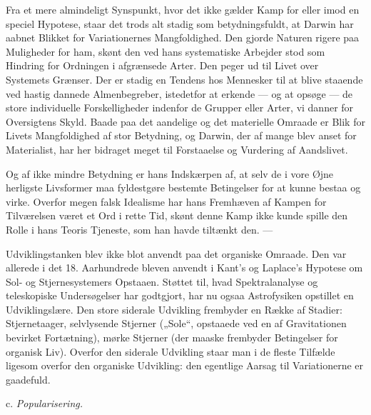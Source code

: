 \documentclass[12pt,a4paper,openany]{book}
\newcommand{\sectionhead}[2]{\par\bigskip\phantomsection\begin{center}#1 \textit{#2}\end{center}\addcontentsline{toc}{section}{#1 #2}\medskip\ignorespaces}
\begin{document}
Fra et mere almindeligt Synspunkt, hvor det ikke gælder Kamp
for eller imod en speciel Hypotese, staar det trods alt stadig som
betydningsfuldt, at Darwin har aabnet Blikket for Variationernes
Mangfoldighed. Den gjorde Naturen rigere paa Muligheder for ham,
skønt den ved hans systematiske Arbejder stod som Hindring for
Ordningen i afgrænsede Arter. Den peger ud til Livet over Systemets
Grænser. Der er stadig en Tendens hos Mennesker til at blive staaende
ved hastig dannede Almenbegreber, istedetfor at erkende
--- og at opsøge --- de store individuelle Forskelligheder indenfor de
Grupper eller Arter, vi danner for Oversigtens Skyld. Baade paa det
aandelige og det materielle Omraade er Blik for Livets Mangfoldighed
af stor Betydning, og Darwin, der af mange blev anset for Materialist,
har her bidraget meget til Forstaaelse og Vurdering af
Aandslivet.

Og af ikke mindre Betydning er hans Indskærpen af, at selv de i
vore Øjne herligste Livsformer maa fyldestgøre bestemte Betingelser
for at kunne bestaa og virke. Overfor megen falsk Idealisme har
hans Fremhæven af Kampen for Tilværelsen været et Ord i rette
Tid, skønt denne Kamp ikke kunde spille den Rolle i hans Teoris
Tjeneste, som han havde tiltænkt den. ---

Udviklingstanken blev ikke blot anvendt paa det organiske Omraade.
Den var allerede i det 18. Aarhundrede bleven anvendt i
Kant’s og Laplace’s Hypotese om Sol- og Stjernesystemers Opstaaen.
Støttet til, hvad Spektralanalyse og teleskopiske Undersøgelser har
godtgjort, har nu ogsaa Astrofysiken opstillet en Udviklingslære.
Den store siderale Udvikling frembyder en Række af Stadier:
Stjernetaager, selvlysende Stjerner („Sole“, opstaaede ved en af
Gravitationen bevirket Fortætning), mørke Stjerner (der maaske
frembyder Betingelser for organisk Liv). Overfor den siderale Udvikling
staar man i de fleste Tilfælde ligesom overfor den organiske
Udvikling: den egentlige Aarsag til Variationerne er gaadefuld.
\sectionhead{c.}{Popularisering.}
\end{document}
